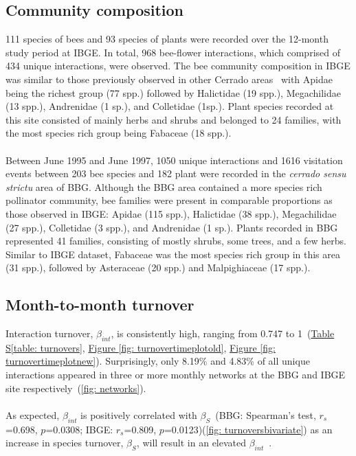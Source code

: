 \documentclass[11pt]{article}
\begin{document}
\subsection{Community composition}
111 species of bees and 93 species of plants were recorded over the 12-month study period at IBGE. In total, 968 bee-flower interactions, which comprised of 434 unique interactions, were observed. The bee community composition in IBGE was similar to those previously observed in other Cerrado areas~\citep{Silveira1995, Pinheiro-Machado2002} with Apidae being the richest group (77 spp.) followed by Halictidae (19 spp.), Megachilidae (13 spp.), Andrenidae (1 sp.), and Colletidae (1sp.). Plant species recorded at this site consisted of mainly herbs and shrubs and belonged to 24 families, with the most species rich group being Fabaceae (18 spp.). \\
\\
Between June 1995 and June 1997, 1050 unique interactions and 1616 visitation events between 203 bee species and 182 plant were recorded in the \textit{cerrado sensu strictu} area of BBG. Although the BBG area contained a more species rich pollinator community, bee families were present in comparable proportions as those observed in IBGE: Apidae (115 spp.), Halictidae (38 spp.), Megachilidae (27 spp.), Colletidae (3 spp.), and Andrenidae (1 sp.). Plants recorded in BBG represented 41 families, consisting of mostly shrubs, some trees, and a few herbs. Similar to IBGE dataset, Fabaceae was the most species rich group in this area (31 spp.), followed by Asteraceae (20 spp.) and Malpighiaceae (17 spp.). \\

\subsection{Month-to-month turnover}
\label{subsec: turnover} 

Interaction turnover, $\beta_{int}$, is consistently high, ranging from 0.747 to 1~(\hyperref[table: turnovers]{Table S\ref{table: turnovers}}, \hyperref[fig: turnovertimeplotold]{Figure \ref{fig: turnovertimeplotold}}, \hyperref[fig: turnovertimeplotnew]{Figure \ref{fig: turnovertimeplotnew}}). Surprisingly, only 8.19\% and 4.83\% of all unique interactions appeared in three or more monthly networks at the BBG and IBGE site respectively~(\autoref{fig: networks}).\\
\\
As expected, $\beta_{int}$ is positively correlated with $\beta_{S}$~(BBG: Spearman's test, $r_{s}$=0.698, $p$=0.0308; IBGE: $r_{s}$=0.809, $p$=0.0123)(\autoref{fig: turnoversbivariate}) as an increase in species turnover, $\beta_{S}$, will result in an elevated $\beta_{int}$~\citep{Poisot2012}.
\end{document}
